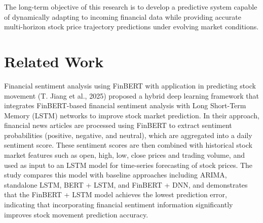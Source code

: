 \documentclass[11pt]{article}
\begin{document}
The long-term objective of this research is to develop a predictive system capable of dynamically adapting to incoming financial data while providing accurate multi-horizon stock price trajectory predictions under evolving market conditions.

\section{Related Work}
Financial sentiment analysis using FinBERT with application in predicting stock movement (T. Jiang et al., 2025) \cite{T.Jiang}{} proposed a hybrid deep learning framework that integrates FinBERT-based financial sentiment analysis with Long Short-Term Memory (LSTM) networks to improve stock market prediction. In their approach, financial news articles are processed using FinBERT to extract sentiment probabilities (positive, negative, and neutral), which are aggregated into a daily sentiment score. These sentiment scores are then combined with historical stock market features such as open, high, low, close prices and trading volume, and used as input to an LSTM model for time-series forecasting of stock prices. The study compares this model with baseline approaches including ARIMA, standalone LSTM, BERT + LSTM, and FinBERT + DNN, and demonstrates that the FinBERT + LSTM model achieves the lowest prediction error, indicating that incorporating financial sentiment information significantly improves stock movement prediction accuracy.
\end{document}
